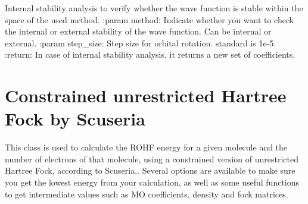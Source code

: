 \documentclass[letterpaper,10pt,english]{sphinxmanual}
\begin{document}
\begin{fulllineitems}
\begin{fulllineitems}
\begin{quote}
\begin{description}
\end{description}\end{quote}

\end{fulllineitems}


\begin{fulllineitems}
\label{\detokenize{UHF:hf.HartreeFock.UHF.MF.stability_analysis}}
Internal stability analysis to verify whether the wave function is stable within the space of the used method.
:param method: Indicate whether you want to check the internal or external stability of the wave function. Can
be internal or external.
:param step\_size: Step size for orbital rotation. standard is 1e-5.
:return: In case of internal stability analysis, it returns a new set of coefficients.

\end{fulllineitems}


\end{fulllineitems}

\label{\detokenize{cUHF_s:module-hf.HartreeFock.cUHF_s}}

\chapter{Constrained unrestricted Hartree Fock by Scuseria}
\label{\detokenize{cUHF_s:constrained-unrestricted-hartree-fock-by-scuseria}}\label{\detokenize{cUHF_s::doc}}
This class is used to calculate the ROHF energy for a given molecule and the number of electrons of that molecule,
using a constrained version of unrestricted Hartree Fock, according to Scuseria..
Several options are available to make sure you get the lowest energy from your calculation, as well as some useful
functions to get intermediate values such as MO coefficients, density and fock matrices.
\end{document}
